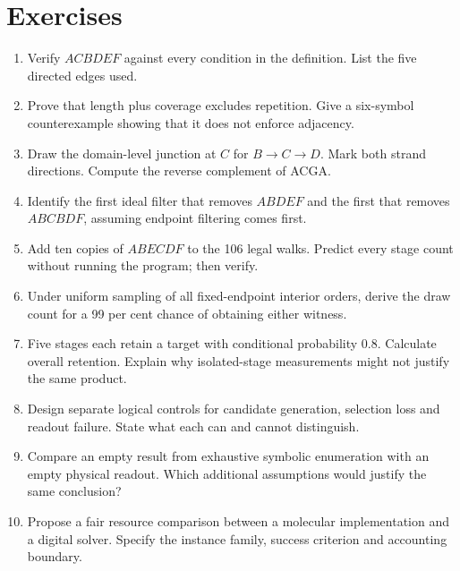 \section{Exercises}\label{sec:exercises}
\begin{enumerate}
\item Verify $ACBDEF$ against every condition in the definition. List the five
directed edges used.
\item Prove that length plus coverage excludes repetition. Give a six-symbol
counterexample showing that it does not enforce adjacency.
\item Draw the domain-level junction at $C$ for $B\to C\to D$. Mark both strand
directions. Compute the reverse complement of ACGA.
\item Identify the first ideal filter that removes $ABDEF$ and the first that
removes $ABCBDF$, assuming endpoint filtering comes first.
\item Add ten copies of $ABECDF$ to the 106 legal walks. Predict every stage
count without running the program; then verify.
\item Under uniform sampling of all fixed-endpoint interior orders, derive the
draw count for a 99 per cent chance of obtaining either witness.
\item Five stages each retain a target with conditional probability 0.8.
Calculate overall retention. Explain why isolated-stage measurements might not
justify the same product.
\item Design separate logical controls for candidate generation, selection loss
and readout failure. State what each can and cannot distinguish.
\item Compare an empty result from exhaustive symbolic enumeration with an empty
physical readout. Which additional assumptions would justify the same
conclusion?
\item Propose a fair resource comparison between a molecular implementation and
a digital solver. Specify the instance family, success criterion and accounting
boundary.
\end{enumerate}

